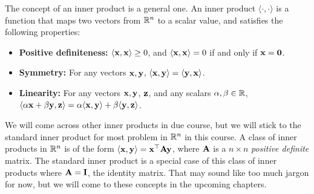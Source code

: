 The concept of an inner product is a general one. An inner product $\langle \cdot, \cdot \rangle$ is a function that maps two vectors from $\mathbb{R}^n$ to a scalar value, and satisfies the following properties:
\begin{itemize}
    \item \textbf{Positive definiteness:} $\langle \mathbf{x}, \mathbf{x} \rangle \geq 0$, and $\langle \mathbf{x}, \mathbf{x} \rangle = 0$ if and only if $\mathbf{x} = \mathbf{0}$.
    \item \textbf{Symmetry:} For any vectors $\mathbf{x}, \mathbf{y}$, $\langle \mathbf{x}, \mathbf{y} \rangle = \langle \mathbf{y}, \mathbf{x} \rangle$.
    \item \textbf{Linearity:} For any vectors $\mathbf{x}, \mathbf{y}$, $\mathbf{z}$, and any scalars $\alpha, \beta \in \mathbb{R}$, $\langle \alpha\mathbf{x} + \beta \mathbf{y}, \mathbf{z} \rangle = \alpha \langle \mathbf{x}, \mathbf{y}\rangle + \beta \langle \mathbf{y}, \mathbf{z}\rangle$.
\end{itemize}
We will come across other inner products in due course, but we will stick to the standard inner product for most problem in $\mathbb{R}^n$ in this course. A class of inner products in $\mathbb{R}^n$ is of the form $\langle \mathbf{x}, \mathbf{y}\rangle = \mathbf{x}^\top\mathbf{A}\mathbf{y}$, where $\mathbf{A}$ is a $n \times n$ \textit{positive definite} matrix. The standard inner product is a special case of this class of inner products where $\mathbf{A} = \mathbf{I}$, the identity matrix. That may sound like too much jargon for now, but we will come to these concepts in the upcoming chapters.


